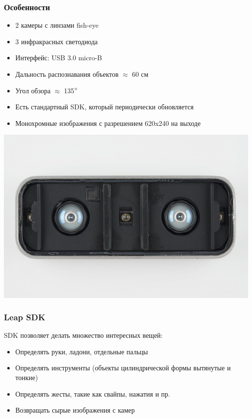\documentclass{beamer}
\begin{document}
		\begin{frame}
			\frametitle{Особенности}
			
			\begin{itemize}
				\item 2 камеры с линзами fish-eye
				\item 3 инфракрасных светодиода
				\item Интерфейс: USB 3.0 micro-B
				\item Дальность распознавания объектов $\approx$ 60 см
				\item Угол обзора $\approx$ 135$\degree$
				\item Есть стандартный SDK, который периодически обновляется
				\item Монохромные изображения с разрешением 620x240 на выходе
			\end{itemize}
			
			\begin{center}
				\includegraphics[scale=0.25]{LeapMotionDisassembled}
			\end{center}
		\end{frame}
		
		\begin{frame}
			\frametitle{Leap SDK}
			
			SDK позволяет делать множество интересных вещей:
			\begin{itemize}
				\item Определять руки, ладони, отдельные пальцы
				\item Определять инструменты (объекты цилиндрической формы вытянутые и тонкие)
				\item Определять жесты, такие как свайпы, нажатия и пр.
				\item Возвращать сырые изображения с камер
			\end{itemize}
		\end{frame}
		
\end{document}
